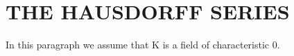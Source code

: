 \section{THE HAUSDORFF SERIES}

In this paragraph we assume that K is a field of characteristic 0.

